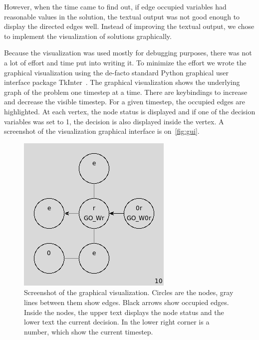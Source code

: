 However, when the time came to find out, if edge occupied variables had
reasonable values in the solution, the textual output was not good enough to
display the directed edges well. Instead of improving the textual output, we
chose to implement the visualization of solutions graphically.

Because the visualization was used mostly for debugging purposes, there was not
a lot of effort and time put into writing it. To minimize the effort we wrote
the graphical visualization using the de-facto standard Python graphical user
interface package TkInter~\cite{tkinter}. The graphical visualization shows the
underlying graph of the problem one timestep at a time. There are keybindings
to increase and decrease the visible timestep. For a given timestep, the
occupied edges are highlighted. At each vertex, the node status is displayed
and if one of the decision variables was set to 1, the decision is also displayed
inside the vertex. A screenshot of the visualization graphical interface is
on~\autoref{fig:gui}.

\begin{figure}[h]
    \begin{center}
	\includegraphics[scale=0.6]{fig/app/ex10.png}
        \caption{Screenshot of the graphical visualization. Circles are the
            nodes, gray lines between them show edges. Black arrows show
            occupied edges. Inside the nodes, the upper text displays the node
            status and the lower text the current decision. In the lower right
        corner is a number, which show the current timestep. }
        \label{fig:gui}
    \end{center}
\end{figure}

